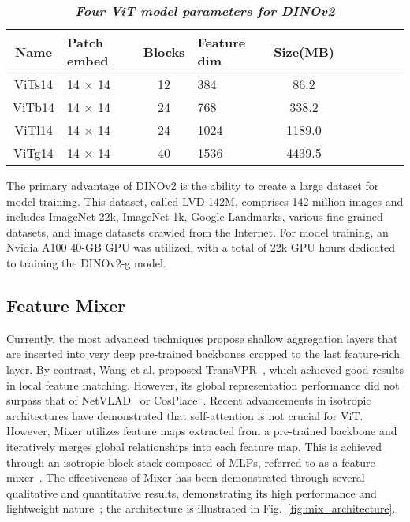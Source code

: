 \begin{table}[!t]
\renewcommand{\thetable}{1}    %
    \caption{\emph{\textbf{Four ViT model parameters for DINOv2}}}
    \centering
    \begin{tabular}{c p{1.2cm} c p{1cm} c p{1cm} c p{1.1cm} c p{1cm}}
    \hline
    Name & Patch embed & Blocks & Feature dim & Size(MB) \\
    \hline
    ViTs14 & 14 × 14 & 12 & 384 & 86.2 \\
    ViTb14 & 14 × 14 & 24 & 768 & 338.2 \\
    ViTl14 & 14 × 14 & 24 & 1024 & 1189.0 \\
    ViTg14 & 14 × 14 & 40 & 1536 & 4439.5 \\
    \hline
    \end{tabular}
    \label{tab:Four ViT model param}
\end{table}

The primary advantage of DINOv2 is the ability to create a large dataset for model training. This dataset, called LVD-142M, comprises 142 million images and includes ImageNet-22k, ImageNet-1k, Google Landmarks, various fine-grained datasets, and image datasets crawled from the Internet. For model training, an Nvidia A100 40-GB GPU was utilized, with a total of 22k GPU hours dedicated to training the DINOv2-g model.

\subsection{Feature Mixer}
\label{Feature Mixer}

Currently, the most advanced techniques propose shallow aggregation layers that are inserted into very deep pre-trained backbones cropped to the last feature-rich layer. By contrast, Wang et al. proposed TransVPR~\cite{wang_transvpr_2022}, which achieved good results in local feature matching. However, its global representation performance did not surpass that of NetVLAD~\cite{relja_netvlad_2018} or CosPlace~\cite{berton_rethinking_2022}. Recent advancements in isotropic architectures have demonstrated that self-attention is not crucial for ViT. However, Mixer utilizes feature maps extracted from a pre-trained backbone and iteratively merges global relationships into each feature map. This is achieved through an isotropic block stack composed of MLPs, referred to as a feature mixer~\cite{tolstikhin_mlp-mixer_2021}. The effectiveness of Mixer has been demonstrated through several qualitative and quantitative results, demonstrating its high performance and lightweight nature~\cite{ali-bey_mixvpr_2023}; the architecture is illustrated in Fig.~\ref{fig:mix_architecture}.

